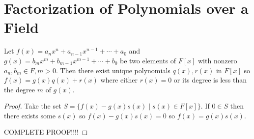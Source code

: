 \section{Factorization of Polynomials over a Field}

\begin{theorem}
    Let $f(x) = a_nx^n + a_{n-1}x^{n-1} + \cdots + a_0$ and $g(x) = b_mx^m + b_{m-1}x^{m-1} + \cdots + b_0$ be two elements of $F[x]$ with nonzero $a_n, b_m \in F, m > 0.$ Then there exist unique polynomials $q(x), r(x)$ in $F[x]$ so $f(x) = g(x)q(x) + r(x)$ where either $r(x) = 0$ or its degree is less than the degree $m$ of $g(x)$.
\end{theorem}
\begin{proof}
    Take the set $S = \{f(x) - g(x)s(x) \mid s(x) \in F[x]\}.$ If $0 \in S$ then there exists some $s(x)$ so $f(x)-g(x)s(x) = 0$ so $f(x) = g(x)s(x).$


    COMPLETE PROOF!!!!

\end{proof}


